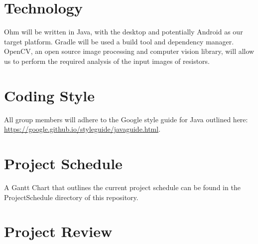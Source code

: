 \documentclass{article}
\begin{document}
\section{Technology}
Ohm will be written in Java, with the desktop and potentially Android as our target platform. Gradle will be used a build tool and dependency manager. OpenCV, an open source image processing and computer vision library, will allow us to perform the required analysis of the input images of resistors.

\section{Coding Style}
All group members will adhere to the Google style guide for Java outlined here: \url{https://google.github.io/styleguide/javaguide.html}.


\section{Project Schedule}
A Gantt Chart that outlines the current project schedule can be found in the ProjectSchedule directory of this repository.

\section{Project Review}
\end{document}
